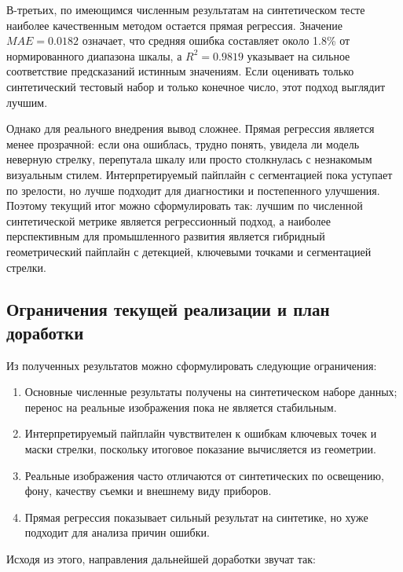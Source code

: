 \documentclass[a4paper,14pt]{extarticle}
\begin{document}
	В-третьих, по имеющимся численным результатам на синтетическом тесте наиболее качественным методом остается прямая регрессия. Значение $MAE=0.0182$ означает, что средняя ошибка составляет около 1.8\% от нормированного диапазона шкалы, а $R^2=0.9819$ указывает на сильное соответствие предсказаний истинным значениям. Если оценивать только синтетический тестовый набор и только конечное число, этот подход выглядит лучшим.

		Однако для реального внедрения вывод сложнее. Прямая регрессия является менее прозрачной: если она ошиблась, трудно понять, увидела ли модель неверную стрелку, перепутала шкалу или просто столкнулась с незнакомым визуальным стилем. Интерпретируемый пайплайн с сегментацией пока уступает по зрелости, но лучше подходит для диагностики и постепенного улучшения. Поэтому текущий итог можно сформулировать так: лучшим по численной синтетической метрике является регрессионный подход, а наиболее перспективным для промышленного развития является гибридный геометрический пайплайн с детекцией, ключевыми точками и сегментацией стрелки.

	\subsection{Ограничения текущей реализации и план доработки}

	Из полученных результатов можно сформулировать следующие ограничения:

\begin{enumerate}[leftmargin=1.5cm]
		\item Основные численные результаты получены на синтетическом наборе данных; перенос на реальные изображения пока не является стабильным.
		\item Интерпретируемый пайплайн чувствителен к ошибкам ключевых точек и маски стрелки, поскольку итоговое показание вычисляется из геометрии.
		\item Реальные изображения часто отличаются от синтетических по освещению, фону, качеству съемки и внешнему виду приборов.
		\item Прямая регрессия показывает сильный результат на синтетике, но хуже подходит для анализа причин ошибки.
	\end{enumerate}

Исходя из этого, направления дальнейшей доработки звучат так:
\end{document}
